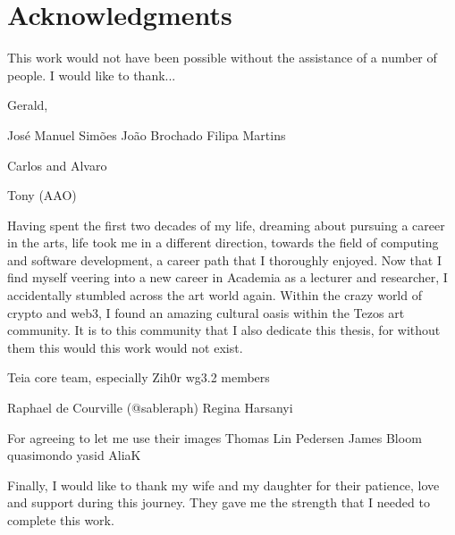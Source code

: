 \chapter*{Acknowledgments}

\todo

This work would not have been possible without the assistance of a number of people. I would like to thank...

Gerald,

José Manuel Simões
João Brochado
Filipa Martins

Carlos and Alvaro

Tony (AAO)


Having spent the first two decades of my life, dreaming about pursuing a career in the arts, life took me in a different direction, towards the field of computing and software development, a career path that I thoroughly enjoyed. Now that I find myself veering into a new career in Academia as a lecturer and researcher, I accidentally stumbled across the art world again. Within the crazy world of crypto and web3, I found an amazing cultural oasis within the Tezos art community. It is to this community that I also dedicate this thesis, for without them this would this work would not exist. 


Teia core team, especially Zih0r
wg3.2 members


Raphael de Courville (@sableraph)
Regina Harsanyi


For agreeing to let me use their images
Thomas Lin Pedersen
James Bloom
quasimondo
yasid
AliaK

Finally, I would like to thank my wife and my daughter for their patience, love and support during this journey. They gave me the strength that I needed to complete this work.


